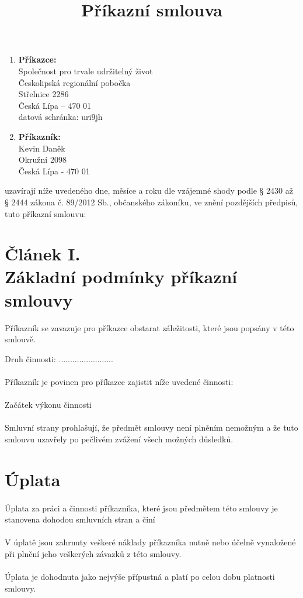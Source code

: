 \documentclass[]{article}
\title{
	{\textbf{Příkazní smlouva}}
}
\date{}
\newcommand{\prikazce}{\textbf{Příkazce:}\\
	Společnost pro trvale udržitelný život\\
	Českolipská regionální pobočka\\
	Střelnice 2286\\
	Česká Lípa – 470 01\\
	datová schránka: uri9jh\\}
\newcommand{\prikaznik}{\textbf{Příkazník:}\\
	Kevin Daněk\\
	Okružní 2098\\
	Česká Lípa - 470 01
}
\begin{document}
\maketitle

\begin{enumerate}
	\item \prikazce
	\item \prikaznik
\end{enumerate}

uzavírají níže uvedeného dne, měsíce a roku dle vzájemné shody podle § 2430 až § 2444 zákona č. 89/2012 Sb., občanského zákoníku, ve znění pozdějších předpisů, tuto příkazní smlouvu:

\section*{
Článek I.\\
Základní podmínky příkazní smlouvy
}

Příkazník se zavazuje pro příkazce obstarat záležitosti, které jsou popsány v této smlouvě.

Druh činnosti: ........................


\paragraph{} Příkazník je povinen pro příkazce zajistit níže uvedené činnosti:
\paragraph{} Začátek výkonu činnosti
\paragraph{} Smluvní strany prohlašují, že předmět smlouvy není plněním nemožným a že tuto smlouvu uzavřely po pečlivém zvážení všech možných důsledků.

\section{Úplata}
\paragraph{} Úplata za práci a činnosti příkazníka, které jsou předmětem této smlouvy je stanovena dohodou smluvních stran a činí
\paragraph{} V úplatě jsou zahrnuty veškeré náklady příkazníka nutně nebo účelně vynaložené při plnění jeho veškerých závazků z této smlouvy.

\paragraph{} Úplata je dohodnuta jako nejvýše přípustná a platí po celou dobu platnosti smlouvy.
\end{document}
